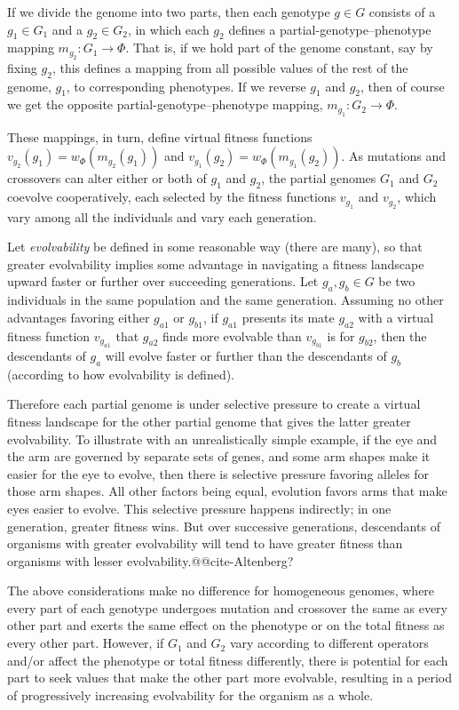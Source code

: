 \documentclass[letterpaper]{article}
\begin{document}
If we divide the genome into two parts, then each genotype $g \in G$ consists
of a $g_1 \in G_1$ and a $g_2 \in G_2$, in which each $g_2$ defines a
partial-genotype--phenotype mapping $m_{g_2} : G_1 \rightarrow \Phi$. That is,
if we hold part of the genome constant, say by fixing $g_2$, this defines a
mapping from all possible values of the rest of the genome, $g_1$, to
corresponding phenotypes. If we reverse $g_1$ and $g_2$, then of course we get
the opposite partial-genotype--phenotype mapping, $m_{g_1} : G_2 \rightarrow
\Phi$.

These mappings, in turn, define virtual fitness functions $v_{g_2}(g_1) =
w_\Phi(m_{g_2}(g_1))$ and $v_{g_1}(g_2) = w_\Phi(m_{g_1}(g_2))$. As mutations
and crossovers can alter either or both of $g_1$ and $g_2$, the partial
genomes $G_1$ and $G_2$ coevolve cooperatively, each selected by
the fitness functions $v_{g_1}$ and $v_{g_2}$, which vary among all the
individuals and vary each generation.

Let \textit{evolvability} be defined in some reasonable way (there are many),
so that greater evolvability implies some advantage in navigating a fitness
landscape upward faster or further over succeeding generations. Let $g_a,g_b
\in G$ be two individuals in the same population and the same generation.
Assuming no other advantages favoring either $g_{a1}$ or $g_{b1}$, if $g_{a1}$
presents its mate $g_{a2}$ with a virtual fitness function $v_{g_{a1}}$ that
$g_{a2}$ finds more evolvable than $v_{g_{b1}}$ is for $g_{b2}$, then the
descendants of $g_a$ will evolve faster or further than the descendants of
$g_b$ (according to how evolvability is defined).

Therefore each partial genome is under selective pressure to create a virtual
fitness landscape for the other partial genome that gives the latter greater
evolvability. To illustrate with an unrealistically simple example, if the eye
and the arm are governed by separate sets of genes, and some arm shapes make
it easier for the eye to evolve, then there is selective pressure favoring
alleles for those arm shapes. All other factors being equal, evolution favors
arms that make eyes easier to evolve. This selective pressure happens
indirectly; in one generation, greater fitness wins. But over successive
generations, descendants of organisms with greater evolvability will tend to
have greater fitness than organisms with lesser evolvability.@@cite-Altenberg?

The above considerations make no difference for homogeneous genomes, where
every part of each genotype undergoes mutation and crossover the same as every
other part and exerts the same effect on the phenotype or on the total fitness
as every other part. However, if $G_1$ and $G_2$ vary according to different
operators and/or affect the phenotype or total fitness differently, there is
potential for each part to seek values that make the other part more
evolvable, resulting in a period of progressively increasing evolvability for
the organism as a whole.
\end{document}
